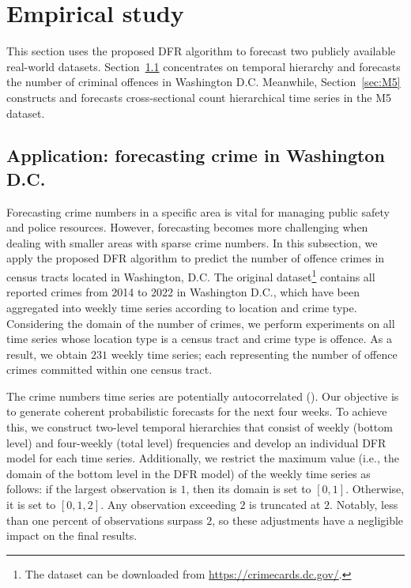 \documentclass[a4paper,review,12pt,authoryear]{elsarticle}
\theoremstyle{definition}
\begin{document}
     \section{Empirical study}
     \label{sec:application}
     This section uses the proposed DFR algorithm to forecast two publicly available real-world datasets.
     Section~\ref{sec:application_crime} concentrates on temporal hierarchy and forecasts the number of criminal offences in Washington D.C.
     Meanwhile, Section~\ref{sec:M5} constructs and forecasts cross-sectional count hierarchical time series in the M5 dataset.

     \subsection{Application: forecasting crime in Washington D.C.}
     \label{sec:application_crime}

     Forecasting crime numbers in a specific area is vital for managing public safety and police resources.
     However, forecasting becomes more challenging when dealing with smaller areas with sparse crime numbers.
     In this subsection, we apply the proposed DFR algorithm to predict the number of offence crimes in census tracts located in Washington, D.C.
     The original dataset\footnote{The dataset can be downloaded from \url{https://crimecards.dc.gov/}.} contains all reported crimes from 2014 to 2022 in Washington D.C., which have been aggregated into weekly time series according to location and crime type.
     Considering the domain of the number of crimes, we perform experiments on all time series whose location type is a census tract and crime type is offence.
     As a result, we obtain $231$ weekly time series; each representing the number of offence crimes committed within one census tract.

     The crime numbers time series are potentially autocorrelated (\citealp{aldor-noimanSpatioTemporalLowCount2013}).
     Our objective is to generate coherent probabilistic forecasts for the next four weeks.
     To achieve this, we construct two-level temporal hierarchies that consist of weekly (bottom level) and four-weekly (total level) frequencies and develop an individual DFR model for each time series.
     Additionally, we restrict the maximum value (i.e., the domain of the bottom level in the DFR model) of the weekly time series as follows: if the largest observation is $1$, then its domain is set to $[0, 1]$.
     Otherwise, it is set to $[0, 1, 2]$.
     Any observation exceeding $2$ is truncated at $2$.
     Notably, less than one percent of observations surpass $2$, so these adjustments have a negligible impact on the final results.
\end{document}
